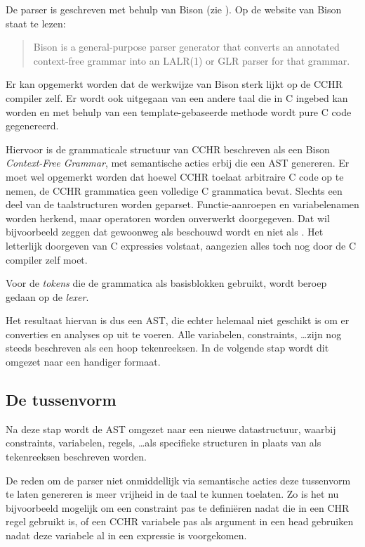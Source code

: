 De parser is geschreven met behulp van Bison (zie \cite{bison}). Op de website van Bison staat te lezen: \begin{quote}
  Bison is a general-purpose parser generator that converts an annotated context-free grammar into an LALR(1) or GLR parser for that grammar.
\end{quote}

Er kan opgemerkt worden dat de werkwijze van Bison sterk lijkt op de CCHR compiler zelf. Er wordt ook uitgegaan van een andere taal die in C ingebed kan worden en met behulp van een template-gebaseerde methode wordt pure C code gegenereerd.

Hiervoor is de grammaticale structuur van CCHR beschreven als een Bison {\em Context-Free Grammar}, met semantische acties erbij die een AST genereren. Er moet wel opgemerkt worden dat hoewel CCHR toelaat arbitraire C code op te nemen, de CCHR grammatica geen volledige C grammatica bevat. Slechts een deel van de taalstructuren worden geparset. Functie-aanroepen en variabelenamen worden herkend, maar operatoren worden onverwerkt doorgegeven. Dat wil bijvoorbeeld zeggen dat  gewoonweg als  beschouwd wordt en niet als . Het letterlijk doorgeven van C expressies volstaat, aangezien alles toch nog door de C compiler zelf moet.

Voor de {\em tokens} die de grammatica als basisblokken gebruikt, wordt beroep gedaan op de {\em lexer}.

Het resultaat hiervan is dus een AST, die echter helemaal niet geschikt is om er converties en analyses op uit te voeren. Alle variabelen, constraints, \ldots zijn nog steeds beschreven als een hoop tekenreeksen. In de volgende stap wordt dit omgezet naar een handiger formaat. 

\subsection{De tussenvorm} \label{sec:tussenvorm}

Na deze stap wordt de AST omgezet naar een nieuwe datastructuur, waarbij constraints, variabelen, regels, \ldots als specifieke structuren in plaats van als tekenreeksen beschreven worden. 

De reden om de parser niet onmiddellijk via semantische acties deze tussenvorm te laten genereren is meer vrijheid in de taal te kunnen toelaten. Zo is het nu bijvoorbeeld mogelijk om een constraint pas te defini\"eren nadat die in een CHR regel gebruikt is, of een CCHR variabele pas als argument in een head gebruiken nadat deze variabele al in een expressie is voorgekomen.

